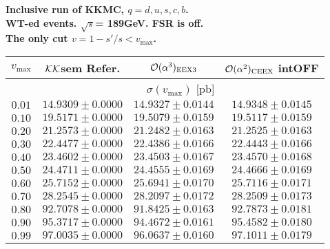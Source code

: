 \documentclass[12pt,dvips]{article}
\begin{document}
\pagestyle{empty}
  

{\Large\bf\color{blue}
\noindent
Inclusive run of {\cal KK}MC, $q=d,u,s,c,b$. \\
WT-ed events. $\sqrt{s}$= 189GeV. FSR is off.\\
The only cut $v=1-s'/s<v_{\max}$.
}
\vspace{10mm}

\noindent
\begin{tabular}                                                                                          {||c|c|c|c||}
\hline\hline
{\color{blue}$v_{\max}$}                                                        &
{\color{blue} ${\cal KK}$sem Refer.}                                            &
{\color{blue}${\cal O}(\alpha^3)_{\rm EEX3}$ }                                  &
{\color{red}${\cal O}(\alpha^2)_{\rm CEEX}$ intOFF}                             
\\
\hline
& \multicolumn{ 3}{c||}{
     {\color{red}$\sigma(v_{\max})$ [pb]}                                             }
\\
\hline
$      0.01$ & $   14.9309\pm  0.0000$ & $   14.9327\pm  0.0144$ & $   14.9348\pm  0.0145$
\\
\hline
$      0.10$ & $   19.5171\pm  0.0000$ & $   19.5079\pm  0.0159$ & $   19.5117\pm  0.0159$
\\
$      0.20$ & $   21.2573\pm  0.0000$ & $   21.2482\pm  0.0163$ & $   21.2525\pm  0.0163$
\\
$      0.30$ & $   22.4477\pm  0.0000$ & $   22.4386\pm  0.0166$ & $   22.4443\pm  0.0166$
\\
$      0.40$ & $   23.4602\pm  0.0000$ & $   23.4503\pm  0.0167$ & $   23.4570\pm  0.0168$
\\
$      0.50$ & $   24.4711\pm  0.0000$ & $   24.4555\pm  0.0169$ & $   24.4666\pm  0.0169$
\\
$      0.60$ & $   25.7152\pm  0.0000$ & $   25.6941\pm  0.0170$ & $   25.7116\pm  0.0171$
\\
$      0.70$ & $   28.2545\pm  0.0000$ & $   28.2097\pm  0.0172$ & $   28.2509\pm  0.0173$
\\
$      0.80$ & $   92.7078\pm  0.0000$ & $   91.8425\pm  0.0163$ & $   92.7873\pm  0.0181$
\\
$      0.90$ & $   95.3717\pm  0.0000$ & $   94.4672\pm  0.0161$ & $   95.4582\pm  0.0180$
\\
\hline
$      0.99$ & $   97.0035\pm  0.0000$ & $   96.0637\pm  0.0160$ & $   97.1011\pm  0.0179$

\end{tabular}
\end{document}
